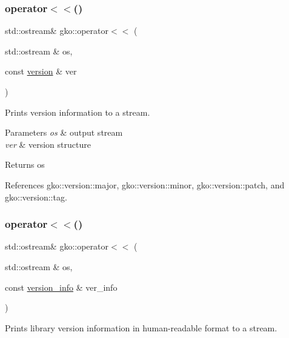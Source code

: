 \subsubsection{\texorpdfstring{operator$<$$<$()}{operator<<()}\hspace{0.1cm}{\footnotesize\ttfamily [1/2]}}
{\footnotesize\ttfamily std\+::ostream\& gko\+::operator$<$$<$ (\begin{DoxyParamCaption}\item[{std\+::ostream \&}]{os,  }\item[{const \hyperlink{structgko_1_1version}{version} \&}]{ver }\end{DoxyParamCaption})\hspace{0.3cm}{\ttfamily [inline]}}



Prints version information to a stream. 


\begin{DoxyParams}{Parameters}
{\em os} & output stream \\
\hline
{\em ver} & version structure\\
\hline
\end{DoxyParams}
\begin{DoxyReturn}{Returns}
os 
\end{DoxyReturn}


References gko\+::version\+::major, gko\+::version\+::minor, gko\+::version\+::patch, and gko\+::version\+::tag.

\mbox{\label{namespacegko_ad9e3ba96a10fe47a03ceef39b45bd43c}} 
\subsubsection{\texorpdfstring{operator$<$$<$()}{operator<<()}\hspace{0.1cm}{\footnotesize\ttfamily [2/2]}}
{\footnotesize\ttfamily std\+::ostream\& gko\+::operator$<$$<$ (\begin{DoxyParamCaption}\item[{std\+::ostream \&}]{os,  }\item[{const \hyperlink{classgko_1_1version__info}{version\+\_\+info} \&}]{ver\+\_\+info }\end{DoxyParamCaption})}



Prints library version information in human-\/readable format to a stream. 


